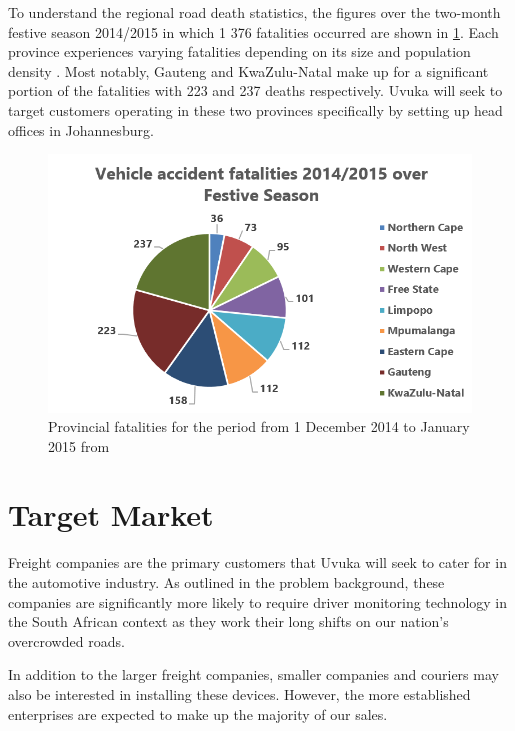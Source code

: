 To understand the regional road death statistics, the figures over the two-month festive season 2014/2015 in which 1 376 fatalities occurred are shown in \cref{fig:festiveSeason}. Each province experiences varying fatalities depending on its size and population density \cite{ProvincialFestiveStats}. Most notably, Gauteng and KwaZulu-Natal make up for a significant portion of the fatalities with 223 and 237 deaths respectively. Uvuka will seek to target customers operating in these two provinces specifically by setting up head offices in Johannesburg.

\begin{figure}[H]
\centering
\includegraphics[width=1\textwidth]{images/provincial_fatalities.PNG}
\vskip10pt
\caption[Provincial fatalities for the period from 1 December 2014 to 7 January 2015]{Provincial fatalities for the period from 1 December 2014 to  January 2015 from \cite{ProvincialFestiveStats}}
\label{fig:festiveSeason}
\end{figure}

\section{Target Market}
Freight companies are the primary customers that Uvuka will seek to cater for in the automotive industry. As outlined in the problem background, these companies are significantly more likely to require driver monitoring technology in the South African context as they work their long shifts on our nation's overcrowded roads.

In addition to the larger freight companies, smaller companies and couriers may also be interested in installing these devices. However, the more established enterprises are expected to make up the majority of our sales.

